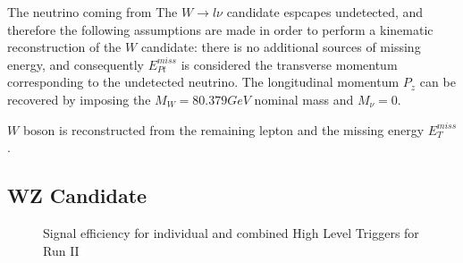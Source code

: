 The neutrino coming from The $W \rightarrow l\nu$ candidate espcapes undetected,
and therefore the following assumptions are made in order to perform a kinematic
reconstruction of the $W$ candidate: there is no additional sources of missing
energy, and consequently $E_{Pt}^{miss}$ is considered the transverse momentum
corresponding to the undetected neutrino. The longitudinal momentum $P_z$ can be
recovered by imposing the $M_W = 80.379 GeV $ nominal mass and $M_\nu = 0.$

$W$ boson is reconstructed from the remaining lepton
and the missing energy $E_T^{miss}$. 




\subsection{WZ Candidate}








\begin{figure}[tph]
  \centering
  \caption{Signal efficiency for individual and combined High Level Triggers for Run II}
  \label{fig:hltSignalEfficiency}
\end{figure}

